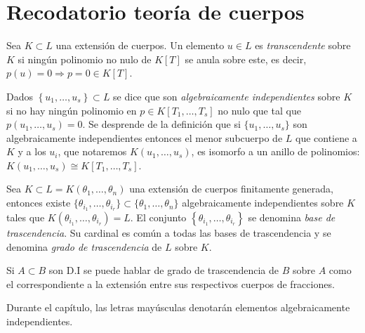 \documentclass[../main.tex]{subfiles}
\begin{document}
\section{Recodatorio teoría de cuerpos}
Sea $K \subset L$ una extensión de cuerpos. Un elemento $u \in L$ es \emph{transcendente} sobre $K$ si ningún polinomio no nulo de $K[T]$ se anula sobre este, es decir, $p(u)=0 \Rightarrow p=0 \in K[T]$.

Dados $\left\{u_{1}, \ldots, u_{s}\right\} \subset L$ se dice que son \emph{algebraicamente independientes} sobre $K$ si no hay ningún polinomio en $p\in K[T_1,\dots, T_s]$ no nulo que tal que $p\left(u_{1}, \ldots, u_{s}\right)=0$.
Se desprende de la definición que si $\{u_{1}, \ldots, u_{s}\}$ son algebraicamente independientes entonces el menor subcuerpo de $L$ que contiene a $K$ y a los $u_i$, que notaremos $K(u_{1}, \ldots, u_{s})$, es isomorfo a un anillo de polinomios:
$K(u_{1}, \ldots, u_{s}) \cong K[T_{1}, \ldots, T_{s}]$.

Sea $K \subset L=K\left(\theta_{1}, \ldots, \theta_{n}\right)$ una extensión de cuerpos finitamente generada, entonces existe $\{\theta_{i_{1}}, \ldots, \theta_{i_{r}}\}\subset \{\theta_{1}, \ldots, \theta_{n}\}$ algebraicamente
independientes sobre $K$ tales que $K\left(\theta_{i_{1}}, \ldots, \theta_{i_{r}}\right) = L$. El conjunto $\left\{\theta_{i_{1}}, \ldots, \theta_{i_{r}}\right\}$ se denomina \emph{base de trascendencia}. Su cardinal es común a todas las bases de trascendencia y se denomina \emph{grado de trascendencia} de $L$ sobre $K$.

Si $A \subset B$ son D.I se puede hablar de grado de trascendencia de $B$ sobre $A$ como el correspondiente a la extensión entre sus respectivos cuerpos de fracciones.

\begin{remark}
Durante el capítulo, las letras mayúsculas denotarán elementos algebraicamente independientes.
\end{remark}
\end{document}

